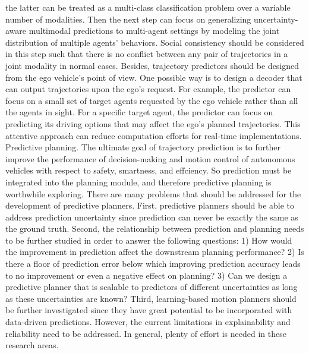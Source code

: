 the latter can be treated as a multi-class classification problem over a variable number of modalities. Then the next step can focus on generalizing uncertainty-aware
multimodal predictions to multi-agent settings by modeling the joint distribution
of multiple agents’ behaviors. Social consistency should be considered in this step
such that there is no conflict between any pair of trajectories in a joint modality
in normal cases. Besides, trajectory predictors should be designed from the ego
vehicle’s point of view. One possible way is to design a decoder that can output
trajectories upon the ego’s request. For example, the predictor can focus on a small
set of target agents requested by the ego vehicle rather than all the agents in sight.
For a specific target agent, the predictor can focus on predicting its driving options
that may affect the ego’s planned trajectories. This attentive approach can reduce
computation efforts for real-time implementations.
Predictive planning. The ultimate goal of trajectory prediction is to further
improve the performance of decision-making and motion control of autonomous
vehicles with respect to safety, smartness, and effciency. So prediction must be integrated into the planning module, and therefore predictive planning is worthwhile
exploring. There are many problems that should be addressed for the development
of predictive planners. First, predictive planners should be able to address prediction uncertainty since prediction can never be exactly the same as the ground truth.
Second, the relationship between prediction and planning needs to be further studied in order to answer the following questions: 1) How would the improvement in
prediction affect the downstream planning performance? 2) Is there a floor of prediction error below which improving prediction accuracy leads to no improvement
or even a negative effect on planning? 3) Can we design a predictive planner that
is scalable to predictors of different uncertainties as long as these uncertainties are
known? Third, learning-based motion planners should be further investigated since
they have great potential to be incorporated with data-driven predictions. However, the current limitations in explainability and reliability need to be addressed.
In general, plenty of effort is needed in these research areas.
